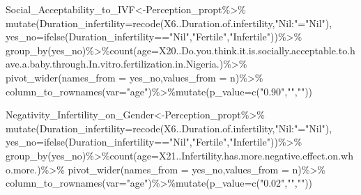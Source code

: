 \documentclass[
]{article}
\newenvironment{Shaded}{\begin{snugshade}}{\end{snugshade}}
\newcommand{\AttributeTok}[1]{\textcolor[rgb]{0.77,0.63,0.00}{#1}}
\newcommand{\FunctionTok}[1]{\textcolor[rgb]{0.00,0.00,0.00}{#1}}
\newcommand{\NormalTok}[1]{#1}
\newcommand{\OtherTok}[1]{\textcolor[rgb]{0.56,0.35,0.01}{#1}}
\newcommand{\SpecialCharTok}[1]{\textcolor[rgb]{0.00,0.00,0.00}{#1}}
\newcommand{\StringTok}[1]{\textcolor[rgb]{0.31,0.60,0.02}{#1}}
\begin{document}
\begin{Shaded}
\begin{Highlighting}[]
\NormalTok{Social\_Acceptability\_to\_IVF}\OtherTok{\textless{}{-}}\NormalTok{Perception\_propt}\SpecialCharTok{\%\textgreater{}\%}
  \FunctionTok{mutate}\NormalTok{(}\AttributeTok{Duration\_infertility=}\FunctionTok{recode}\NormalTok{(X6..Duration.of.infertility,}\StringTok{"Nil:"}\OtherTok{=}\StringTok{"Nil"}\NormalTok{),}
         \AttributeTok{yes\_no=}\FunctionTok{ifelse}\NormalTok{(Duration\_infertility}\SpecialCharTok{==}\StringTok{"Nil"}\NormalTok{,}\StringTok{"Fertile"}\NormalTok{,}\StringTok{"Infertile"}\NormalTok{))}\SpecialCharTok{\%\textgreater{}\%}
  \FunctionTok{group\_by}\NormalTok{(yes\_no)}\SpecialCharTok{\%\textgreater{}\%}\FunctionTok{count}\NormalTok{(}\AttributeTok{age=}\NormalTok{X20..Do.you.think.it.is.socially.acceptable.to.have.a.baby.through.In.vitro.fertilization.in.Nigeria.)}\SpecialCharTok{\%\textgreater{}\%}
  \FunctionTok{pivot\_wider}\NormalTok{(}\AttributeTok{names\_from =}\NormalTok{ yes\_no,}\AttributeTok{values\_from =}\NormalTok{ n)}\SpecialCharTok{\%\textgreater{}\%}
  \FunctionTok{column\_to\_rownames}\NormalTok{(}\AttributeTok{var=}\StringTok{"age"}\NormalTok{)}\SpecialCharTok{\%\textgreater{}\%}\FunctionTok{mutate}\NormalTok{(}\AttributeTok{p\_value=}\FunctionTok{c}\NormalTok{(}\StringTok{"0.90"}\NormalTok{,}\StringTok{""}\NormalTok{,}\StringTok{""}\NormalTok{))}

\NormalTok{Negativity\_Infertility\_on\_Gender}\OtherTok{\textless{}{-}}\NormalTok{Perception\_propt}\SpecialCharTok{\%\textgreater{}\%}
  \FunctionTok{mutate}\NormalTok{(}\AttributeTok{Duration\_infertility=}\FunctionTok{recode}\NormalTok{(X6..Duration.of.infertility,}\StringTok{"Nil:"}\OtherTok{=}\StringTok{"Nil"}\NormalTok{),}
         \AttributeTok{yes\_no=}\FunctionTok{ifelse}\NormalTok{(Duration\_infertility}\SpecialCharTok{==}\StringTok{"Nil"}\NormalTok{,}\StringTok{"Fertile"}\NormalTok{,}\StringTok{"Infertile"}\NormalTok{))}\SpecialCharTok{\%\textgreater{}\%}
  \FunctionTok{group\_by}\NormalTok{(yes\_no)}\SpecialCharTok{\%\textgreater{}\%}\FunctionTok{count}\NormalTok{(}\AttributeTok{age=}\NormalTok{X21..Infertility.has.more.negative.effect.on.who.more.)}\SpecialCharTok{\%\textgreater{}\%}
  \FunctionTok{pivot\_wider}\NormalTok{(}\AttributeTok{names\_from =}\NormalTok{ yes\_no,}\AttributeTok{values\_from =}\NormalTok{ n)}\SpecialCharTok{\%\textgreater{}\%}
  \FunctionTok{column\_to\_rownames}\NormalTok{(}\AttributeTok{var=}\StringTok{"age"}\NormalTok{)}\SpecialCharTok{\%\textgreater{}\%}\FunctionTok{mutate}\NormalTok{(}\AttributeTok{p\_value=}\FunctionTok{c}\NormalTok{(}\StringTok{"0.02"}\NormalTok{,}\StringTok{""}\NormalTok{,}\StringTok{""}\NormalTok{))}



\end{Highlighting}
\end{Shaded}
\end{document}
